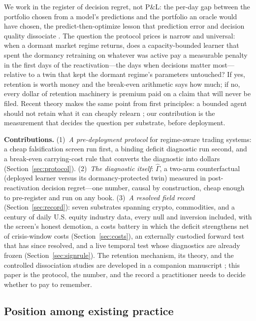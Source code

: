 \documentclass[sigconf,anonymous]{acmart}
\newcommand{\G}{\hat\Gamma}
\begin{document}
We work in the register of decision regret, not P\&L: the per-day gap
between the portfolio chosen from a model's predictions and the portfolio
an oracle would have chosen, the predict-then-optimize
lesson that prediction error and decision quality dissociate
\cite{elmachtoub2022smart,mandi2024decision}. The question the protocol
prices is narrow and universal: when a dormant market regime returns,
does a capacity-bounded learner that spent the dormancy retraining on
whatever was active pay a measurable penalty in the first days of the
reactivation---the days when decisions matter most---relative to a twin
that kept the dormant regime's parameters untouched? If yes, retention is
worth money and the break-even arithmetic says how much; if no, every
dollar of retention machinery is premium paid on a claim that will never
be filed. Recent theory makes the same point from first principles: a
bounded agent should not retain what it can cheaply relearn
\cite{kumar2025continual}; our contribution is the measurement that
decides the question per substrate, before deployment.

\textbf{Contributions.} (1)~\emph{A pre-deployment protocol} for
regime-aware trading systems: a cheap falsification screen run first, a
binding deficit diagnostic run second, and a break-even carrying-cost
rule that converts the diagnostic into dollars
(Section~\ref{sec:protocol}). (2)~\emph{The diagnostic itself}: $\G$, a
two-arm counterfactual (deployed learner versus its dormancy-protected
twin) measured in post-reactivation decision regret---one number, causal
by construction, cheap enough to pre-register and run on any book.
(3)~\emph{A resolved field record} (Section~\ref{sec:record}): seven
substrates spanning crypto, commodities, and a century of daily U.S.
equity industry data, every null and inversion included, with the
screen's honest demotion, a costs battery in which the deficit
strengthens net of crisis-window costs (Section~\ref{sec:costs}), an
externally custodied forward test that has since resolved, and a live
temporal test whose diagnostics are already frozen
(Section~\ref{sec:signrule}). The retention mechanism, its theory, and
the controlled dissociation studies are developed in a companion
manuscript \cite{companion2026}; this paper is the
protocol, the number, and the record a practitioner needs to decide
whether to pay to remember.

\subsection{Position among existing practice}
\label{sec:related}
\end{document}
